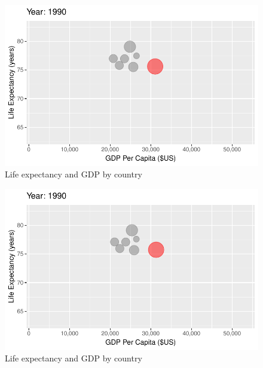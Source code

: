 \documentclass[
  letterpaper,
  DIV=11,
  numbers=noendperiod]{scrreport}
\theoremstyle{definition}
\theoremstyle{remark}
\begin{document}
\begin{figure}

{\centering \includegraphics{index_files/figure-pdf/fig-anim-country-69.pdf}

}

\caption{\label{fig-anim-country-69}Life expectancy and GDP by country}

\end{figure}

\begin{figure}

{\centering \includegraphics{index_files/figure-pdf/fig-anim-country-70.pdf}

}

\caption{\label{fig-anim-country-70}Life expectancy and GDP by country}

\end{figure}
\end{document}

